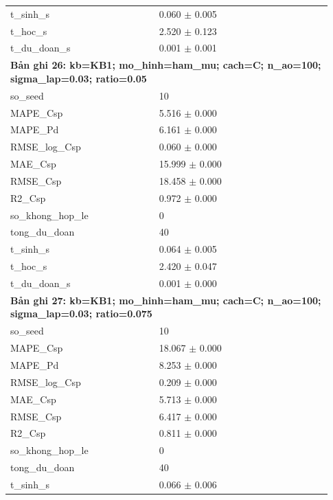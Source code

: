 \begin{longtable}{p{0.43\linewidth}p{0.50\linewidth}}
t\_\allowbreak sinh\_\allowbreak s & 0.060 $\pm$ 0.005 \\
t\_\allowbreak hoc\_\allowbreak s & 2.520 $\pm$ 0.123 \\
t\_\allowbreak du\_\allowbreak doan\_\allowbreak s & 0.001 $\pm$ 0.001 \\
\midrule
\multicolumn{2}{p{0.95\linewidth}}{\textbf{Bản ghi 26: kb=KB1; mo\_hinh=ham\_mu; cach=C; n\_ao=100; sigma\_lap=0.03; ratio=0.05}} \\
so\_\allowbreak seed & 10 \\
MAPE\_\allowbreak Csp & 5.516 $\pm$ 0.000 \\
MAPE\_\allowbreak Pd & 6.161 $\pm$ 0.000 \\
RMSE\_\allowbreak log\_\allowbreak Csp & 0.060 $\pm$ 0.000 \\
MAE\_\allowbreak Csp & 15.999 $\pm$ 0.000 \\
RMSE\_\allowbreak Csp & 18.458 $\pm$ 0.000 \\
R2\_\allowbreak Csp & 0.972 $\pm$ 0.000 \\
so\_\allowbreak khong\_\allowbreak hop\_\allowbreak le & 0 \\
tong\_\allowbreak du\_\allowbreak doan & 40 \\
t\_\allowbreak sinh\_\allowbreak s & 0.064 $\pm$ 0.005 \\
t\_\allowbreak hoc\_\allowbreak s & 2.420 $\pm$ 0.047 \\
t\_\allowbreak du\_\allowbreak doan\_\allowbreak s & 0.001 $\pm$ 0.000 \\
\midrule
\multicolumn{2}{p{0.95\linewidth}}{\textbf{Bản ghi 27: kb=KB1; mo\_hinh=ham\_mu; cach=C; n\_ao=100; sigma\_lap=0.03; ratio=0.075}} \\
so\_\allowbreak seed & 10 \\
MAPE\_\allowbreak Csp & 18.067 $\pm$ 0.000 \\
MAPE\_\allowbreak Pd & 8.253 $\pm$ 0.000 \\
RMSE\_\allowbreak log\_\allowbreak Csp & 0.209 $\pm$ 0.000 \\
MAE\_\allowbreak Csp & 5.713 $\pm$ 0.000 \\
RMSE\_\allowbreak Csp & 6.417 $\pm$ 0.000 \\
R2\_\allowbreak Csp & 0.811 $\pm$ 0.000 \\
so\_\allowbreak khong\_\allowbreak hop\_\allowbreak le & 0 \\
tong\_\allowbreak du\_\allowbreak doan & 40 \\
t\_\allowbreak sinh\_\allowbreak s & 0.066 $\pm$ 0.006 \\

\end{longtable}
